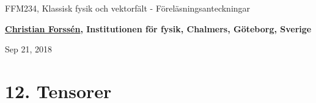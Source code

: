 \documentclass[%
oneside,                 %
final,                   %
10pt]{article}
\begin{document}

\newcommand{\exercisesection}[1]{\subsection*{#1}}







\thispagestyle{empty}

\begin{center}
{\LARGE\bf
\begin{spacing}{1.25}
FFM234, Klassisk fysik och vektorfält - Föreläsningsanteckningar
\end{spacing}
}
\end{center}


\begin{center}
{\bf \href{{http://fy.chalmers.se/subatom/tsp/}}{Christian Forssén}, Institutionen för fysik, Chalmers, Göteborg, Sverige${}^{}$} \\ [0mm]
\end{center}

\begin{center}
\end{center}
    

\begin{center}
Sep 21, 2018
\end{center}

\vspace{1cm}


\section*{12. Tensorer}
\end{document}
